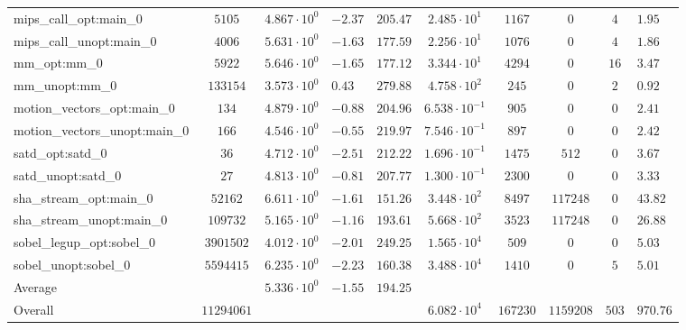 \begin{tabular}{|l|c|HHc|c|c|c|cH|}
mips\_call\_opt:main\_0                         & $ 5105     $ & $ 4.867 \cdot 10^{0} $ & $ -2.37 $ & $ 205.47 $ & $ 2.485 \cdot 10^{1}  $ & $ 1167   $ & $ 0       $ & $ 4   $ & $ 1.95    $ \\
mips\_call\_unopt:main\_0                       & $ 4006     $ & $ 5.631 \cdot 10^{0} $ & $ -1.63 $ & $ 177.59 $ & $ 2.256 \cdot 10^{1}  $ & $ 1076   $ & $ 0       $ & $ 4   $ & $ 1.86    $ \\
mm\_opt:mm\_0                                   & $ 5922     $ & $ 5.646 \cdot 10^{0} $ & $ -1.65 $ & $ 177.12 $ & $ 3.344 \cdot 10^{1}  $ & $ 4294   $ & $ 0       $ & $ 16  $ & $ 3.47    $ \\
mm\_unopt:mm\_0                                 & $ 133154   $ & $ 3.573 \cdot 10^{0} $ & $ 0.43  $ & $ 279.88 $ & $ 4.758 \cdot 10^{2}  $ & $ 245    $ & $ 0       $ & $ 2   $ & $ 0.92    $ \\
motion\_vectors\_opt:main\_0                    & $ 134      $ & $ 4.879 \cdot 10^{0} $ & $ -0.88 $ & $ 204.96 $ & $ 6.538 \cdot 10^{-1} $ & $ 905    $ & $ 0       $ & $ 0   $ & $ 2.41    $ \\
motion\_vectors\_unopt:main\_0                  & $ 166      $ & $ 4.546 \cdot 10^{0} $ & $ -0.55 $ & $ 219.97 $ & $ 7.546 \cdot 10^{-1} $ & $ 897    $ & $ 0       $ & $ 0   $ & $ 2.42    $ \\
satd\_opt:satd\_0                               & $ 36       $ & $ 4.712 \cdot 10^{0} $ & $ -2.51 $ & $ 212.22 $ & $ 1.696 \cdot 10^{-1} $ & $ 1475   $ & $ 512     $ & $ 0   $ & $ 3.67    $ \\
satd\_unopt:satd\_0                             & $ 27       $ & $ 4.813 \cdot 10^{0} $ & $ -0.81 $ & $ 207.77 $ & $ 1.300 \cdot 10^{-1} $ & $ 2300   $ & $ 0       $ & $ 0   $ & $ 3.33    $ \\
sha\_stream\_opt:main\_0                        & $ 52162    $ & $ 6.611 \cdot 10^{0} $ & $ -1.61 $ & $ 151.26 $ & $ 3.448 \cdot 10^{2}  $ & $ 8497   $ & $ 117248  $ & $ 0   $ & $ 43.82   $ \\
sha\_stream\_unopt:main\_0                      & $ 109732   $ & $ 5.165 \cdot 10^{0} $ & $ -1.16 $ & $ 193.61 $ & $ 5.668 \cdot 10^{2}  $ & $ 3523   $ & $ 117248  $ & $ 0   $ & $ 26.88   $ \\
sobel\_legup\_opt:sobel\_0                      & $ 3901502  $ & $ 4.012 \cdot 10^{0} $ & $ -2.01 $ & $ 249.25 $ & $ 1.565 \cdot 10^{4}  $ & $ 509    $ & $ 0       $ & $ 0   $ & $ 5.03    $ \\
sobel\_unopt:sobel\_0                           & $ 5594415  $ & $ 6.235 \cdot 10^{0} $ & $ -2.23 $ & $ 160.38 $ & $ 3.488 \cdot 10^{4}  $ & $ 1410   $ & $ 0       $ & $ 5   $ & $ 5.01    $ \\
\hline
Average                                         & $          $ & $ 5.336 \cdot 10^{0} $ & $ -1.55 $ & $ 194.25 $ & $                     $ & $        $ & $         $ & $     $ & $         $ \\
\hline
Overall                                         & $ 11294061 $ & $                    $ & $       $ & $        $ & $ 6.082 \cdot 10^{4}  $ & $ 167230 $ & $ 1159208 $ & $ 503 $ & $ 970.76  $ \\
\hline
\end{tabular}
